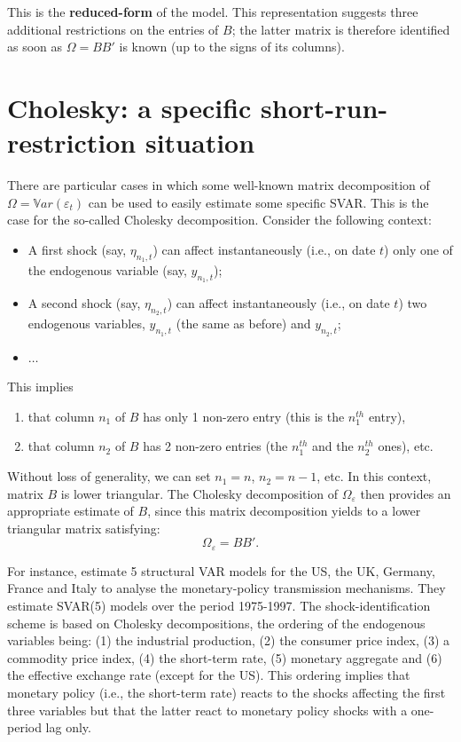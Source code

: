 \documentclass[
  12pt,
]{book}
\providecommand{\tightlist}{%
  \setlength{\itemsep}{0pt}\setlength{\parskip}{0pt}}
\theoremstyle{definition}
\theoremstyle{definition}
\theoremstyle{definition}
\theoremstyle{definition}
\theoremstyle{remark}
\begin{document}
This is the \textbf{reduced-form} of the model. This representation suggests three additional restrictions on the entries of \(B\); the latter matrix is therefore identified as soon as \(\Omega = BB'\) is known (up to the signs of its columns).

\section{Cholesky: a specific short-run-restriction situation}\label{Cholesky}

There are particular cases in which some well-known matrix decomposition of \(\Omega=\mathbb{V}ar(\varepsilon_t)\) can be used to easily estimate some specific SVAR. This is the case for the so-called Cholesky decomposition. Consider the following context:

\begin{itemize}
\tightlist
\item
  A first shock (say, \(\eta_{n_1,t}\)) can affect instantaneously
  (i.e., on date \(t\)) only one of the endogenous variable (say, \(y_{n_1,t}\));
\item
  A second shock (say, \(\eta_{n_2,t}\)) can affect instantaneously
  (i.e., on date \(t\)) two endogenous variables, \(y_{n_1,t}\) (the same as before) and \(y_{n_2,t}\);
\item
  \(\dots\)
\end{itemize}

This implies

\begin{enumerate}
\def\labelenumi{\arabic{enumi}.}
\tightlist
\item
  that column \(n_1\) of \(B\) has only 1 non-zero entry (this is the \(n_1^{th}\) entry),
\item
  that column \(n_2\) of \(B\) has 2 non-zero entries (the \(n_1^{th}\) and the \(n_2^{th}\) ones), etc.
\end{enumerate}

Without loss of generality, we can set \(n_1=n\), \(n_2=n-1\), etc. In this context, matrix \(B\) is lower triangular. The Cholesky decomposition of \(\Omega_{\varepsilon}\) then provides an appropriate estimate of \(B\), since this matrix decomposition yields to a lower triangular matrix satisfying:
\[
\Omega_\varepsilon = BB'.
\]

For instance, \citet{DEDOLA20051543} estimate 5 structural VAR models for the US, the UK, Germany, France and Italy to analyse the monetary-policy transmission mechanisms. They estimate SVAR(5) models over the period 1975-1997. The shock-identification scheme is based on Cholesky decompositions, the ordering of the endogenous variables being: (1) the industrial production, (2) the consumer price index, (3) a commodity price index, (4) the short-term rate, (5) monetary aggregate and (6) the effective exchange rate (except for the US). This ordering implies that monetary policy (i.e., the short-term rate) reacts to the shocks affecting the first three variables but that the latter react to monetary policy shocks with a one-period lag only.
\end{document}
